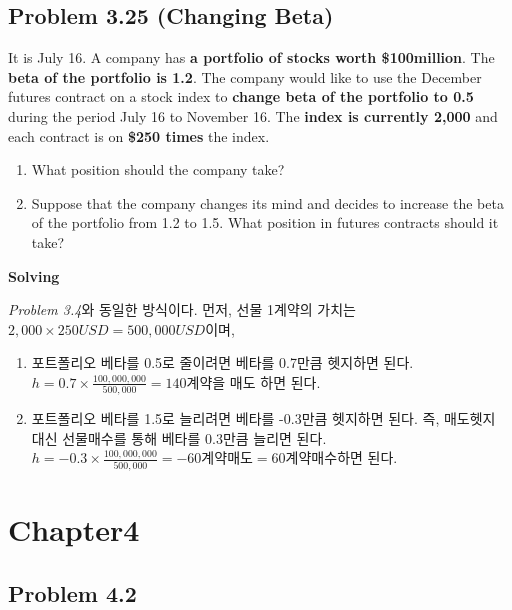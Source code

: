 \documentclass[
  letterpaper,
  DIV=11,
  numbers=noendperiod]{scrreprt}
\begin{document}
\subsection*{\texorpdfstring{\textbf{Problem 3.25} (Changing
Beta)}{Problem 3.25 (Changing Beta)}}\label{problem-3.25-changing-beta}

It is July 16. A company has \textbf{a portfolio of stocks worth
\$100million}. The \textbf{beta of the portfolio is 1.2}. The company
would like to use the December futures contract on a stock index to
\textbf{change beta of the portfolio to 0.5} during the period July 16
to November 16. The \textbf{index is currently 2,000} and each contract
is on \textbf{\$250 times} the index.

\begin{enumerate}
\def\labelenumi{(\arabic{enumi})}
\item
  What position should the company take?
\item
  Suppose that the company changes its mind and decides to increase the
  beta of the portfolio from 1.2 to 1.5. What position in futures
  contracts should it take?
\end{enumerate}

\textbf{Solving}

\emph{Problem 3.4}와 동일한 방식이다. 먼저, 선물 1계약의 가치는
\(2,000\times 250USD=500,000USD\)이며,

\begin{enumerate}
\def\labelenumi{(\arabic{enumi})}
\item
  포트폴리오 베타를 0.5로 줄이려면 베타를 0.7만큼 헷지하면 된다.
  \(h=0.7\times\frac{100,000,000}{500,000}=140계약\)을 매도 하면 된다.
\item
  포트폴리오 베타를 1.5로 늘리려면 베타를 -0.3만큼 헷지하면 된다. 즉,
  매도헷지 대신 선물매수를 통해 베타를 0.3만큼 늘리면 된다.
  \(h=-0.3\times\frac{100,000,000}{500,000}=-60계약 매도=60계약 매수\)하면
  된다.
\end{enumerate}

\section*{Chapter4}\label{chapter4}


\subsection*{\texorpdfstring{\textbf{Problem
4.2}}{Problem 4.2}}\label{problem-4.2}
\end{document}
